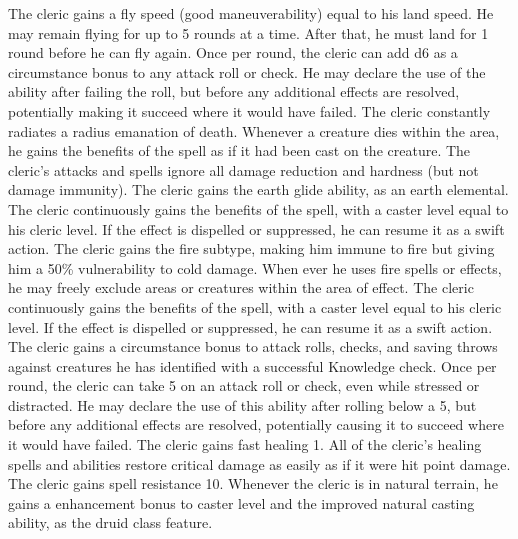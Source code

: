  The cleric gains a fly speed (good maneuverability) equal to his land speed. He may remain flying for up to 5 rounds at a time. After that, he must land for 1 round before he can fly again.
 Once per round, the cleric can add d6 as a circumstance bonus to any attack roll or check. He may declare the use of the ability after failing the roll, but before any additional effects are resolved, potentially making it succeed where it would have failed.
 The cleric constantly radiates a \areamed radius emanation of death. Whenever a creature dies within the area, he gains the benefits of the  spell as if it had been cast on the creature.
 The cleric's attacks and spells ignore all damage reduction and hardness (but not damage immunity).
 The cleric gains the earth glide ability, as an earth elemental.
 The cleric continuously gains the benefits of the  spell, with a caster level equal to his cleric level. If the effect is dispelled or suppressed, he can resume it as a swift action.
 The cleric gains the fire subtype, making him immune to fire but giving him a 50\% vulnerability to cold damage. When ever he uses fire spells or effects, he may freely exclude areas or creatures within the area of effect.
 The cleric continuously gains the benefits of the  spell, with a caster level equal to his cleric level. If the effect is dispelled or suppressed, he can resume it as a swift action.
 The cleric gains a  circumstance bonus to attack rolls, checks, and saving throws against creatures he has identified with a successful Knowledge check.
 Once per round, the cleric can take 5 on an attack roll or check, even while stressed or distracted. He may declare the use of this ability after rolling below a 5, but before any additional effects are resolved, potentially causing it to succeed where it would have failed.
 The cleric gains fast healing 1. All of the cleric's healing spells and abilities restore critical damage as easily as if it were hit point damage.
 The cleric gains spell resistance 10.
 Whenever the cleric is in natural terrain, he gains a  enhancement bonus to caster level and the improved natural casting ability, as the druid class feature.
